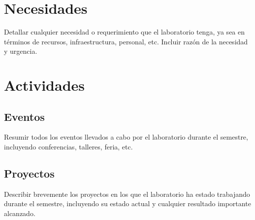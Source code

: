 \documentclass[a4paper,11pt]{article}                 %
\begin{document}
  \section{Necesidades}
    Detallar cualquier necesidad o requerimiento que el laboratorio tenga, ya sea en términos de recursos, infraestructura, personal, etc. Incluir razón de la necesidad y urgencia.

  \section{Actividades}
  \subsection{Eventos}
    Resumir todos los eventos llevados a cabo por el laboratorio durante el semestre, incluyendo conferencias, talleres, feria, etc.
  \subsection{Proyectos}
    Describir brevemente los proyectos en los que el laboratorio ha estado trabajando durante el semestre, incluyendo su estado actual y cualquier resultado importante alcanzado.

\end{document}
